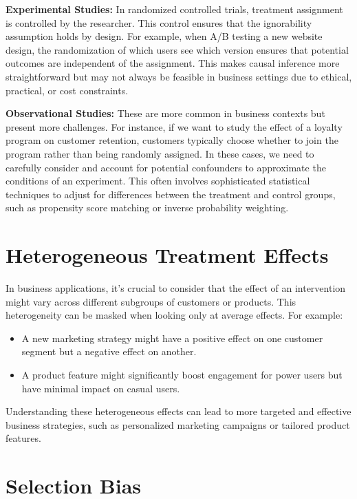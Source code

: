 \documentclass[
  letterpaper,
  DIV=11,
  numbers=noendperiod]{scrreprt}
\providecommand{\tightlist}{%
  \setlength{\itemsep}{0pt}\setlength{\parskip}{0pt}}\usepackage{longtable,booktabs,array}
\begin{document}
\textbf{Experimental Studies:} In randomized controlled trials,
treatment assignment is controlled by the researcher. This control
ensures that the ignorability assumption holds by design. For example,
when A/B testing a new website design, the randomization of which users
see which version ensures that potential outcomes are independent of the
assignment. This makes causal inference more straightforward but may not
always be feasible in business settings due to ethical, practical, or
cost constraints.

\textbf{Observational Studies:} These are more common in business
contexts but present more challenges. For instance, if we want to study
the effect of a loyalty program on customer retention, customers
typically choose whether to join the program rather than being randomly
assigned. In these cases, we need to carefully consider and account for
potential confounders to approximate the conditions of an experiment.
This often involves sophisticated statistical techniques to adjust for
differences between the treatment and control groups, such as propensity
score matching or inverse probability weighting.

\section{Heterogeneous Treatment
Effects}\label{heterogeneous-treatment-effects}

In business applications, it's crucial to consider that the effect of an
intervention might vary across different subgroups of customers or
products. This heterogeneity can be masked when looking only at average
effects. For example:

\begin{itemize}
\tightlist
\item
  A new marketing strategy might have a positive effect on one customer
  segment but a negative effect on another.
\item
  A product feature might significantly boost engagement for power users
  but have minimal impact on casual users.
\end{itemize}

Understanding these heterogeneous effects can lead to more targeted and
effective business strategies, such as personalized marketing campaigns
or tailored product features.

\section{Selection Bias}\label{selection-bias}
\end{document}
